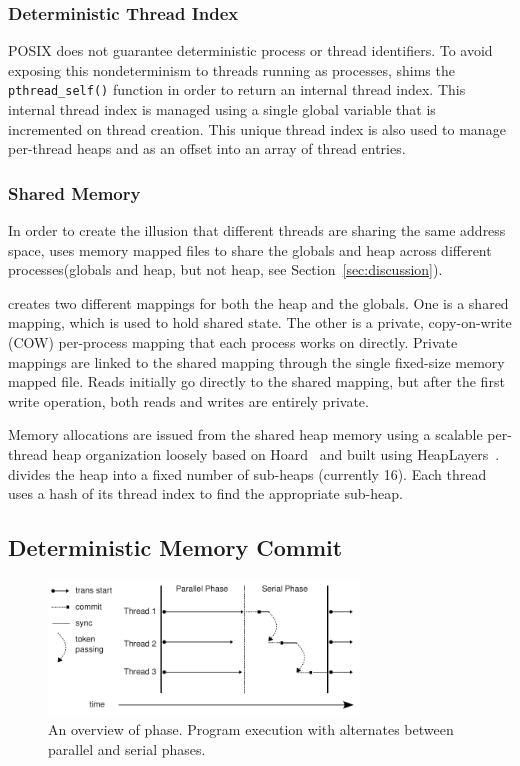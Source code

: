 \subsubsection{Deterministic Thread Index}
\label{sec:threadindex}

POSIX does not guarantee deterministic process or thread identifiers. To avoid exposing this nondeterminism to threads running as processes, \dthreads{} shims the \texttt{pthread\_self()} function in order to return an internal thread index.  This internal thread index is managed using a single global variable that is incremented on thread creation.  This unique thread index is also used to manage per-thread heaps and as an offset into an array of thread entries.

\subsubsection{Shared Memory}
\label{sec:stackandheap}

In order to create the illusion that different threads are sharing the same address space, \dthreads{} uses memory mapped files to share the globals and heap across different processes(globals and heap, but not heap, see Section~\ref{sec:discussion}).

\dthreads{} creates two different mappings for both the heap and the globals.  One is a shared mapping, which is used to hold shared state. The other is a private, copy-on-write (COW) per-process mapping that each process works on directly.  Private mappings are linked to the shared mapping through the single fixed-size memory mapped file. Reads initially go directly to the shared mapping,
but after the first write operation, both reads and writes are entirely private.

Memory allocations are issued from the shared heap memory using a scalable per-thread heap organization loosely based on Hoard~\cite{BergerMcKinleyBlumofeWilson:ASPLOS2000} and built using HeapLayers~\cite{BergerZornMcKinley:2001}.  \dthreads{} divides the heap into a fixed number of sub-heaps (currently 16).  Each thread uses a hash of its thread index to find the appropriate sub-heap.

\subsection{Deterministic Memory Commit}
\label{sec:sharedmem}

\begin{figure}
{\centering 
\includegraphics[width=3.25in]{dthreads/figure/phase}
\caption{An overview of \dthreads{} phase. Program execution with \dthreads{} alternates between parallel and serial phases.\label{fig:phase}}
}
\end{figure}

